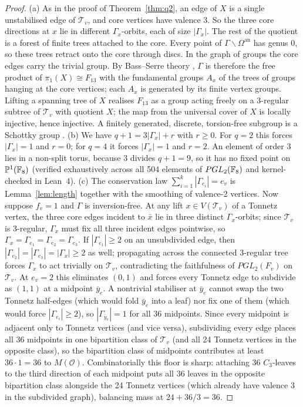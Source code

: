 \documentclass[11pt]{amsart}
\numberwithin{equation}{section}
\theoremstyle{plain}
\theoremstyle{definition}\newtheorem{definition}[theorem]{Definition}
\theoremstyle{remark}\newtheorem{remark}[theorem]{Remark}
\begin{document}
\begin{proof}
(a) As in the proof of Theorem~\ref{thm:q2}, an edge of $X$ is a single unstabilised edge of $\mathcal T_v$, and core vertices have valence 3. So the three core directions at $x$ lie in different $\Gamma_x$-orbits, each of size $|\Gamma_x|$. The rest of the quotient is a forest of finite trees attached to the core. Every point of $\Gamma\backslash\Omega^{\mathrm{an}}$ has genus 0, so these trees retract onto the core through discs. In the graph of groups the core edges carry the trivial group. By Bass--Serre theory \cite{serre80}, $\Gamma$ is therefore the free product of $\pi_1(X)\cong F_{13}$ with the fundamental groups $A_x$ of the trees of groups hanging at the core vertices; each $A_x$ is generated by its finite vertex groups. Lifting a spanning tree of $X$ realises $F_{13}$ as a group acting freely on a 3-regular subtree of $\mathcal T_v$ with quotient $X$; the map from the universal cover of $X$ is locally injective, hence injective. A finitely generated, discrete, torsion-free subgroup is a Schottky group \cite{ihara66,gvdp80}.
(b) We have $q+1=3|\Gamma_x|+r$ with $r\ge0$. For $q=2$ this forces $|\Gamma_x|=1$ and $r=0$; for $q=4$ it forces $|\Gamma_x|=1$ and $r=2$. An element of order 3 lies in a non-split torus, because $3$ divides $q+1=9$, so it has no fixed point on $\mathbb P^1(\mathbb{F}_8)$ (verified exhaustively across all 504 elements of $PGL_2(\mathbb{F}_8)$ and kernel-checked in Lean~4).
(c) The conservation law $\sum_{i=1}^k|\Gamma_{e_i}|=e_v$ is Lemma~\ref{lem:length} together with the smoothing of valence-2 vertices. Now suppose $f_v=1$ and $\Gamma$ is inversion-free. At any lift $x\in V(\mathcal T_v)$ of a Tonnetz vertex, the three core edges incident to $\bar x$ lie in three distinct $\Gamma_x$-orbits; since $\mathcal T_v$ is 3-regular, $\Gamma_x$ must fix all three incident edges pointwise, so $\Gamma_x=\Gamma_{e_1}=\Gamma_{e_2}=\Gamma_{e_3}$. If $|\Gamma_{e_1}|\ge2$ on an unsubdivided edge, then $|\Gamma_{e_2}|=|\Gamma_{e_3}|=|\Gamma_x|\ge2$ as well; propagating across the connected 3-regular tree forces $\Gamma_x$ to act trivially on $\mathcal T_v$, contradicting the faithfulness of $PGL_2(F_v)$ on $\mathcal T_v$. At $e_v=2$ this eliminates $(0,1)$ and forces every Tonnetz edge to subdivide as $(1,1)$ at a midpoint $\bar y_e$. A nontrivial stabiliser at $\bar y_e$ cannot swap the two Tonnetz half-edges (which would fold $\bar y_e$ into a leaf) nor fix one of them (which would force $|\Gamma_{e_i}|\ge2$), so $|\Gamma_{\bar y_e}|=1$ for all 36 midpoints. Since every midpoint is adjacent only to Tonnetz vertices (and vice versa), subdividing every edge places all 36 midpoints in one bipartition class of $\mathcal T_v$ (and all 24 Tonnetz vertices in the opposite class), so the bipartition class of midpoints contributes at least $36\cdot 1=36$ to $M(\mathcal O)$. Combinatorially this floor is sharp: attaching 36 $C_3$-leaves to the third direction of each midpoint puts all 36 leaves in the opposite bipartition class alongside the 24 Tonnetz vertices (which already have valence 3 in the subdivided graph), balancing mass at $24+36/3=36$.
\end{proof}
\end{document}
